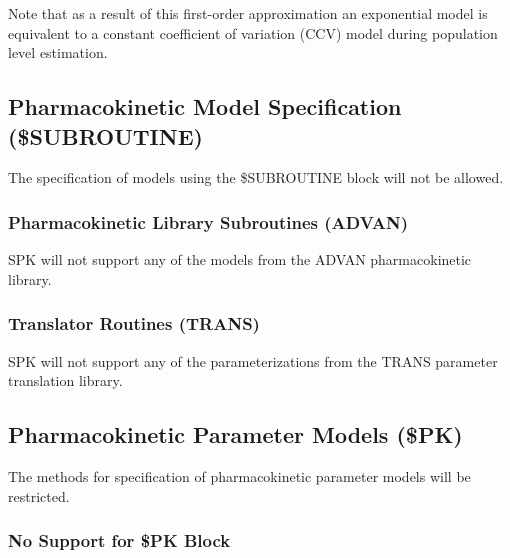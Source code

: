 \documentclass{article}
\begin{document}
Note that as a result of this first-order approximation
an exponential model is equivalent to a constant 
coefficient of variation (CCV) model during population level 
estimation.


\subsection{Pharmacokinetic Model Specification (\$SUBROUTINE)}

The specification of models using the \$SUBROUTINE block will not be allowed.


\subsubsection{Pharmacokinetic Library Subroutines (ADVAN)}

SPK will not support any of the models from the ADVAN pharmacokinetic
library.


\subsubsection{Translator Routines (TRANS)}

SPK will not support any of the parameterizations from the TRANS 
parameter translation library.


\subsection{Pharmacokinetic Parameter Models (\$PK)}

The methods for specification of pharmacokinetic parameter models will
be restricted.


\subsubsection{No Support for \$PK Block}
\end{document}
